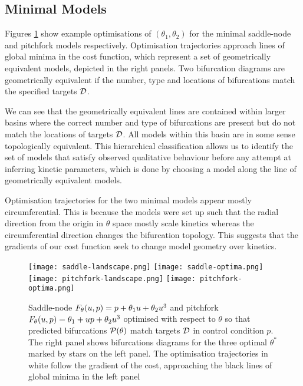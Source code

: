 \subsection{Minimal Models}
Figures \ref{fig:minimal-models:results} show example optimisations of $(\theta_1,\theta_2)$ for the minimal saddle-node and pitchfork models respectively. Optimisation trajectories approach lines of global minima in the cost function, which represent a set of geometrically equivalent models, depicted in the right panels. Two bifurcation diagrams are geometrically equivalent if the number, type and locations of bifurcations match the specified targets $\mathcal{D}$.

We can see that the geometrically equivalent lines are contained within larger basins where the correct number and type of bifurcations are present but do not match the locations of targets $\mathcal{D}$. All models within this basin are in some sense topologically equivalent. This hierarchical classification allows us to identify the set of models that satisfy observed qualitative behaviour \cite{Stumpf2019ParameterBifurcations} before any attempt at inferring kinetic parameters, which is done by choosing a model along the line of geometrically equivalent models.

Optimisation trajectories for the two minimal models appear mostly circumferential. This is because the models were set up such that the radial direction from the origin in $\theta$ space mostly scale kinetics whereas the circumferential direction changes the bifurcation topology. This suggests that the gradients of our cost function seek to change model geometry over kinetics.

\begin{figure}
\centering
\texttt{[image: saddle-landscape.png]}
\texttt{[image: saddle-optima.png]}
\texttt{[image: pitchfork-landscape.png]}
\texttt{[image: pitchfork-optima.png]}
\caption{Saddle-node $F_{\theta}(u,p) = p + \theta_{1}u+\theta_{2}u^3$ and pitchfork $F_{\theta}(u,p) = \theta_{1} + u p +\theta_{2}u^3$ optimised with respect to $\theta$ so that predicted bifurcations $\mathcal{P}(\theta)$ match targets $\mathcal{D}$ in control condition $p$. The right panel shows bifurcations diagrams for the three optimal $\theta^*$ marked by stars on the left panel. The optimisation trajectories in white follow the gradient of the cost, approaching the black lines of global minima in the left panel}
\label{fig:minimal-models:results}
\end{figure}

